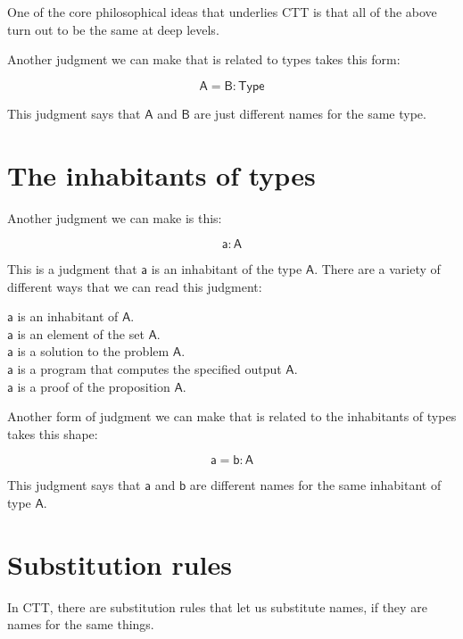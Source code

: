 \documentclass{article}
\newcommand\term{\mathsf}
\def\Type/{\term{Type}}
\begin{document}
One of the core philosophical ideas that underlies CTT is that all of the above turn out to be the same at deep levels.

Another judgment we can make that is related to types takes this form:

\begin{equation*}
  \term{A} = \term{B} : \Type/
\end{equation*}

This judgment says that $\term{A}$ and $\term{B}$ are just different names for the same type.


\section{The inhabitants of types}

Another judgment we can make is this:

\begin{equation*}
  \term{a} : \term{A}
\end{equation*}

This is a judgment that $\term{a}$ is an inhabitant of the type $\term{A}$. There are a variety of different ways that we can read this judgment:

\begin{center}
  $\term{a}$ is an inhabitant of $\term{A}$. \\
  $\term{a}$ is an element of the set $\term{A}$. \\
  $\term{a}$ is a solution to the problem $\term{A}$. \\
  $\term{a}$ is a program that computes the specified output $\term{A}$. \\
  $\term{a}$ is a proof of the proposition $\term{A}$.
\end{center}

Another form of judgment we can make that is related to the inhabitants of types takes this shape:

\begin{equation*}
  \term{a} = \term{b} : \term{A}
\end{equation*}

This judgment says that $\term{a}$ and $\term{b}$ are different names for the same inhabitant of type $\term{A}$.


\section{Substitution rules}

In CTT, there are substitution rules that let us substitute names, if they are names for the same things. 
\end{document}
